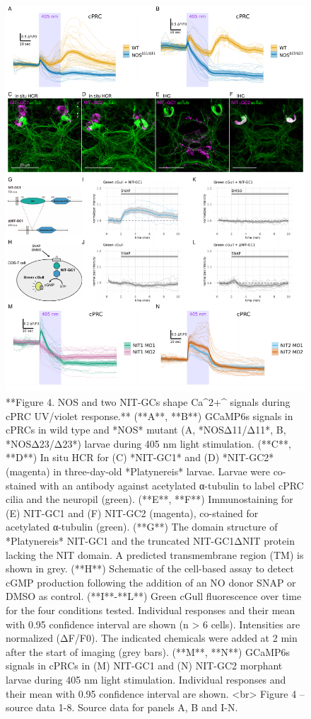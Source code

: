\documentclass[
  10pt,
  onecolumn]{article}
\begin{document}
\begin{figure}
\includegraphics[width=38.89in]{figures/Fig4} \caption{**Figure 4. NOS and two NIT-GCs shape Ca^2+^ signals during cPRC UV/violet response.** (**A**, **B**) GCaMP6s signals in cPRCs in wild type and *NOS* mutant (A, *NOSΔ11/Δ11*, B, *NOSΔ23/Δ23*) larvae during 405 nm light stimulation. (**C**, **D**) In situ HCR for (C) *NIT-GC1* and (D) *NIT-GC2* (magenta) in three-day-old *Platynereis* larvae. Larvae were co-stained with an antibody against acetylated α-tubulin to label cPRC cilia and the neuropil (green). (**E**, **F**) Immunostaining for (E) NIT-GC1 and (F) NIT-GC2 (magenta), co-stained for acetylated α-tubulin (green). (**G**) The domain structure of *Platynereis* NIT-GC1 and the truncated NIT-GC1ΔNIT protein lacking the NIT domain. A predicted transmembrane region (TM) is shown in grey. (**H**) Schematic of the cell-based assay to detect cGMP production following the addition of an NO donor SNAP or DMSO as control. (**I**-**L**) Green cGull fluorescence over time for the four conditions tested. Individual responses and their mean with 0.95 confidence interval are shown (n > 6 cells). Intensities are normalized (ΔF/F0). The indicated chemicals were added at 2 min after the start of imaging (grey bars). (**M**, **N**) GCaMP6s signals in cPRCs in (M) NIT-GC1 and (N) NIT-GC2 morphant larvae during 405 nm light stimulation. Individual responses and their mean with 0.95 confidence interval are shown. <br> Figure 4 -- source data 1-8. Source data for panels A, B and I-N.}\label{fig:unnamed-chunk-4}
\end{figure}
\end{document}
